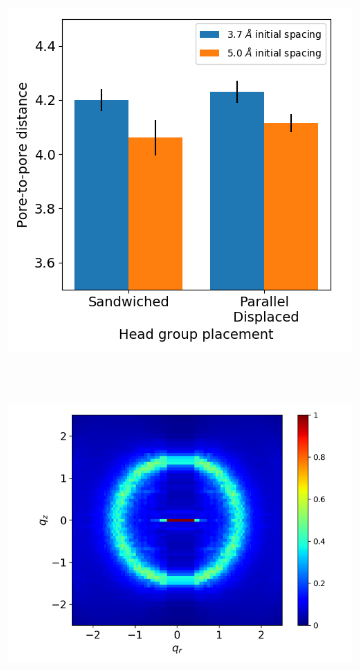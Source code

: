 \documentclass[journal=jpcbfk,manusciprt=article]{achemso}
\begin{document}
\begin{figure}[!hbt]
\begin{subfigure}{0.45\linewidth}
                \includegraphics[width=\linewidth]{p2p2.png}
                \caption{}~\label{fig:p2p_disordered}
        \end{subfigure}
        \begin{subfigure}{0.45\linewidth}
                \centering
                \includegraphics[width=\linewidth]{offset_disordered_rzplot.png}
                \caption{}~\label{fig:offset_disordered_xrd}
        \end{subfigure}%

\end{figure}
\end{document}
